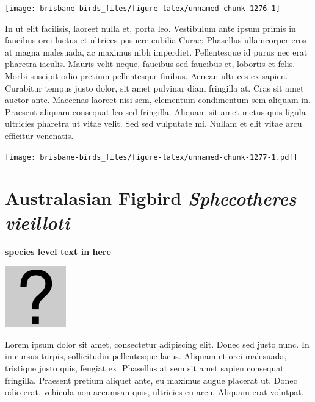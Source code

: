 \documentclass[]{book}
\let\origfigure\figure
\let\endorigfigure\endfigure
\renewenvironment{figure}[1][2] {
  \expandafter\origfigure\expandafter[H]
} {
  \endorigfigure
}
\begin{document}
\begin{figure}
\texttt{[image: brisbane-birds\_files/figure-latex/unnamed-chunk-1276-1]} \caption{insert figure caption}\label{fig:unnamed-chunk-1276}
\end{figure}

In ut elit facilisis, laoreet nulla et, porta leo. Vestibulum ante ipsum
primis in faucibus orci luctus et ultrices posuere cubilia Curae;
Phasellus ullamcorper eros at magna malesuada, ac maximus nibh
imperdiet. Pellentesque id purus nec erat pharetra iaculis. Mauris velit
neque, faucibus sed faucibus et, lobortis et felis. Morbi suscipit odio
pretium pellentesque finibus. Aenean ultrices ex sapien. Curabitur
tempus justo dolor, sit amet pulvinar diam fringilla at. Cras sit amet
auctor ante. Maecenas laoreet nisi sem, elementum condimentum sem
aliquam in. Praesent aliquam consequat leo sed fringilla. Aliquam sit
amet metus quis ligula ultricies pharetra ut vitae velit. Sed sed
vulputate mi. Nullam et elit vitae arcu efficitur venenatis.

\begin{figure}
\centering
\texttt{[image: brisbane-birds\_files/figure-latex/unnamed-chunk-1277-1.pdf]}
\caption{\label{fig:unnamed-chunk-1277}insert figure caption}
\end{figure}

\section{\texorpdfstring{Australasian Figbird \emph{Sphecotheres
vieilloti}}{Australasian Figbird Sphecotheres vieilloti}}\label{australasian-figbird-sphecotheres-vieilloti}

\textbf{species level text in here}

\begin{figure}
\centering
\includegraphics{assets/missing.png}
\caption{No image for species}
\end{figure}

Lorem ipsum dolor sit amet, consectetur adipiscing elit. Donec sed justo
nunc. In in cursus turpis, sollicitudin pellentesque lacus. Aliquam et
orci malesuada, tristique justo quis, feugiat ex. Phasellus at sem sit
amet sapien consequat fringilla. Praesent pretium aliquet ante, eu
maximus augue placerat ut. Donec odio erat, vehicula non accumsan quis,
ultricies eu arcu. Aliquam erat volutpat.
\end{document}
